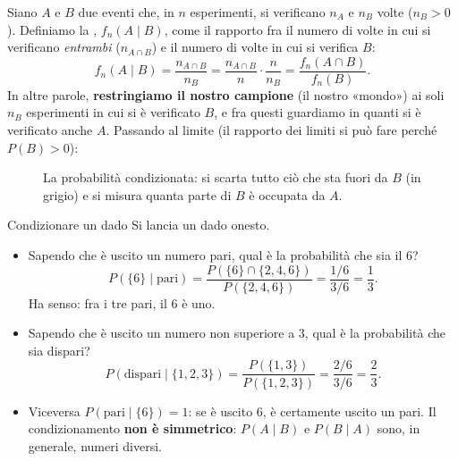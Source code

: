 Siano $A$ e $B$ due eventi che, in $n$ esperimenti, si verificano $n_A$ e $n_B$ volte ($n_B > 0$). Definiamo la
, $f_n(A \mid B)$, come il rapporto fra il numero di volte in cui si
verificano \emph{entrambi} ($n_{A \cap B}$) e il numero di volte in cui si verifica $B$:
\[
  f_n(A \mid B) = \frac{n_{A \cap B}}{n_B} = \frac{n_{A \cap B}}{n} \cdot \frac{n}{n_B}
  = \frac{f_n(A \cap B)}{f_n(B)} .
\]
In altre parole, \textbf{restringiamo il nostro campione} (il nostro «mondo») ai soli $n_B$ esperimenti in cui si è
verificato $B$, e fra questi guardiamo in quanti si è verificato anche $A$. Passando al limite (il rapporto dei limiti
si può fare perché $P(B) > 0$):


\begin{figure}[H]
\centering
{}
\hspace{1.5cm}
\caption{La probabilità condizionata: si scarta tutto ciò che sta fuori da $B$ (in grigio) e si misura quanta parte di
$B$ è occupata da $A$.}
\end{figure}

\begin{esempio}{Condizionare un dado}
Si lancia un dado onesto.
\begin{itemize}
  \item Sapendo che è uscito un numero pari, qual è la probabilità che sia il 6?
        \[ P(\{6\} \mid \text{pari}) = \frac{P(\{6\} \cap \{2,4,6\})}{P(\{2,4,6\})} = \frac{1/6}{3/6} = \frac{1}{3} . \]
        Ha senso: fra i tre pari, il 6 è uno.
  \item Sapendo che è uscito un numero non superiore a 3, qual è la probabilità che sia dispari?
        \[ P(\text{dispari} \mid \{1,2,3\}) = \frac{P(\{1,3\})}{P(\{1,2,3\})} = \frac{2/6}{3/6} = \frac{2}{3} . \]
  \item Viceversa $P(\text{pari} \mid \{6\}) = 1$: se è uscito 6, è certamente uscito un pari. Il condizionamento
        \textbf{non è simmetrico}: $P(A \mid B)$ e $P(B \mid A)$ sono, in generale, numeri diversi.
\end{itemize}
\end{esempio}

